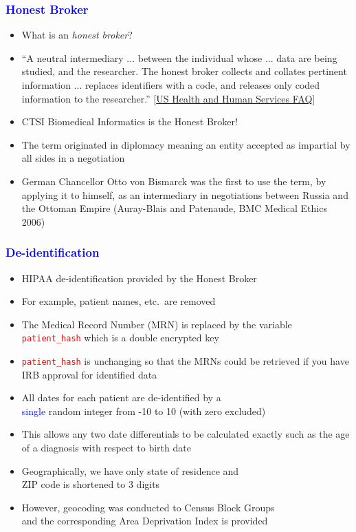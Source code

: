 \documentclass[11pt,pdftex,dvipsnames,usenames]{beamer}
\begin{document}
\begin{frame}[fragile]\frametitle{\bf\textcolor{blue}{Honest Broker}}

\begin{itemize}
\item What is an {\it honest broker}?
\item
``A neutral intermediary ... between the individual whose ... data are being studied, and the researcher. The honest broker collects and collates pertinent information ... replaces identifiers with a code, and releases only coded information to the researcher.''
 \textcolor{PineGreen}{[\href{https://www.hhs.gov/ohrp/sachrp-committee/recommendations/2011-october-13-letter-attachment-d/index.html}{US
     Health and Human Services FAQ}]}
\item CTSI Biomedical Informatics is the Honest Broker!
\item The term originated in diplomacy meaning an entity
accepted as impartial by all sides in a negotiation
\item German Chancellor Otto von Bismarck was the first to use the
  term, by applying it to himself, as an intermediary in negotiations
  between Russia and the Ottoman Empire (Auray-Blais and Patenaude,
  BMC Medical Ethics 2006)
\end{itemize}

\end{frame}

\begin{frame}[fragile]\frametitle{\bf\textcolor{blue}{De-identification}}

\begin{itemize}
\item HIPAA de-identification provided by the Honest Broker
\item For example, patient names, etc.\ are removed
\item The Medical Record Number (MRN) is replaced by
the variable \textcolor{red}{\texttt{patient\_hash}} which is a double
encrypted key 
\item \textcolor{red}{\texttt{patient\_hash}} is unchanging so that
the MRNs could be retrieved if you have IRB approval for identified
data
\item All dates for each patient are de-identified by a\\
\textcolor{blue}{single} random integer from -10 to 10 (with zero excluded)
\item This allows any two date differentials to be calculated
exactly such as the age of a diagnosis with respect to birth date
\item Geographically, we have only state of residence and\\
ZIP code is shortened to 3 digits 
\item However, geocoding was conducted to Census Block Groups\\ 
and the corresponding Area Deprivation Index is provided
\end{itemize}

\end{frame}
\end{document}
